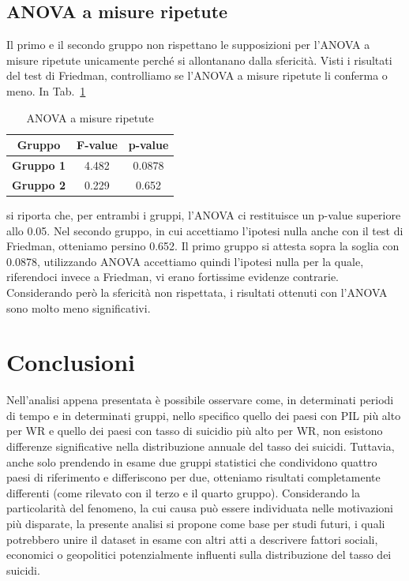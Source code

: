\documentclass[conference]{IEEEtran}
\begin{document}
\subsection{ANOVA a misure ripetute}

Il primo e il secondo gruppo non rispettano le supposizioni per l'ANOVA a misure ripetute
unicamente perché si allontanano dalla sfericità.
Visti i risultati del test di Friedman, controlliamo se l'ANOVA a misure ripetute li conferma
o meno.
In Tab.~\ref{tab7} 
\begin{table}[htbp]
    \caption{ANOVA a misure ripetute}
    \begin{center}
    \begin{tabular}{|c|c|c|}
    \hline
    \textbf{Gruppo} & \textbf{F-value} & \textbf{p-value} \\
    \hline
    \textbf{Gruppo 1} & 4.482 & 0.0878 \\\cline{1-3}
    \textbf{Gruppo 2} & 0.229 & 0.652 \\\cline{1-3}
    \hline
    \end{tabular}
    \label{tab7}
    \end{center}
\end{table}
si riporta che, per entrambi i gruppi, l'ANOVA ci restituisce un p-value superiore allo 0.05.
Nel secondo gruppo, in cui accettiamo l'ipotesi nulla anche con il test di Friedman,
otteniamo persino 0.652.
Il primo gruppo si attesta sopra la soglia con 0.0878, utilizzando ANOVA accettiamo quindi
l'ipotesi nulla per la quale, riferendoci invece a Friedman, vi erano fortissime evidenze contrarie.
Considerando però la sfericità non rispettata, i risultati ottenuti con l'ANOVA sono molto
meno significativi.


\section{Conclusioni}

Nell'analisi appena presentata è possibile osservare come, in determinati periodi di tempo
e in determinati gruppi, nello specifico quello dei paesi con PIL più alto per WR e
quello dei paesi con tasso di suicidio più alto per WR, non esistono differenze
significative nella distribuzione annuale del tasso dei suicidi.
Tuttavia, anche solo prendendo in esame due gruppi statistici che condividono quattro paesi
di riferimento e differiscono per due, otteniamo risultati completamente differenti
(come rilevato con il terzo e il quarto gruppo).
Considerando la particolarità del fenomeno, la cui causa può essere individuata nelle motivazioni più disparate,
la presente analisi si propone come base per studi futuri, i quali potrebbero
unire il dataset in esame
con altri atti a descrivere fattori sociali, economici o geopolitici potenzialmente
influenti sulla distribuzione del tasso dei suicidi.
\end{document}
